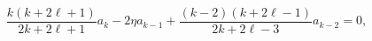 \[\frac{k(k+2\ell+1)}{2k+2\ell+1}a_{k}-2\eta a_{k-1}+\frac{(k-2)(k+2\ell-1)}{2k+%
2\ell-3}a_{k-2}=0,\]